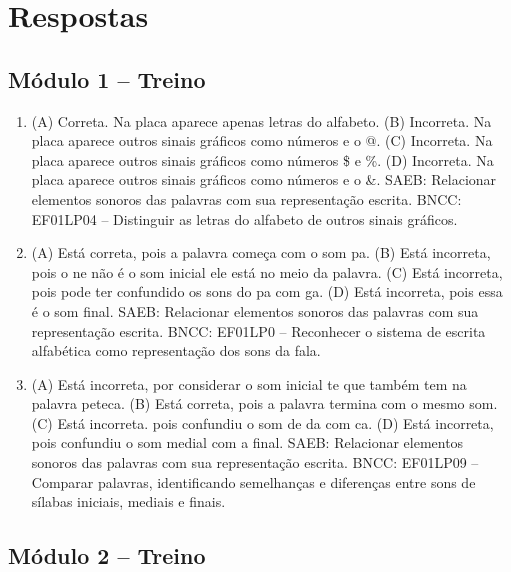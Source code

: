 
\chapter{Respostas}
\pagestyle{plain}
\footnotesize

\pagecolor{gray!40}

\section*{Módulo 1 – Treino}

\begin{enumerate}
\item
(A) Correta. Na placa aparece apenas letras do alfabeto.
(B) Incorreta. Na placa aparece outros sinais gráficos como números e o @.
(C) Incorreta. Na placa aparece outros sinais gráficos como números \$ e \%.
(D) Incorreta. Na placa aparece outros sinais gráficos como números e o \&.
SAEB: Relacionar elementos sonoros das palavras com sua representação escrita. 
BNCC: EF01LP04 -- Distinguir as letras do alfabeto de outros sinais gráficos. 

\item
(A) Está correta, pois a palavra começa com o som pa.
(B) Está incorreta, pois o ne não é o som inicial ele está no meio da palavra.
(C) Está incorreta, pois pode ter confundido os sons do pa com ga.
(D) Está incorreta, pois essa é o som final.
SAEB: Relacionar elementos sonoros das palavras com sua representação escrita.
BNCC: EF01LP0 -- Reconhecer o sistema de escrita alfabética como
representação dos sons da fala.

\item
(A) Está incorreta, por considerar o som inicial te que também tem na palavra peteca.
(B) Está correta, pois a palavra termina com o mesmo som.
(C) Está incorreta. pois confundiu o som de da com ca.
(D) Está incorreta, pois confundiu o som medial com a final.
SAEB: Relacionar elementos
sonoros das palavras com sua representação escrita.
BNCC: EF01LP09 -- Comparar palavras, identificando semelhanças e diferenças
entre sons de sílabas iniciais, mediais e finais.
\end{enumerate}

\section*{Módulo 2 – Treino}

